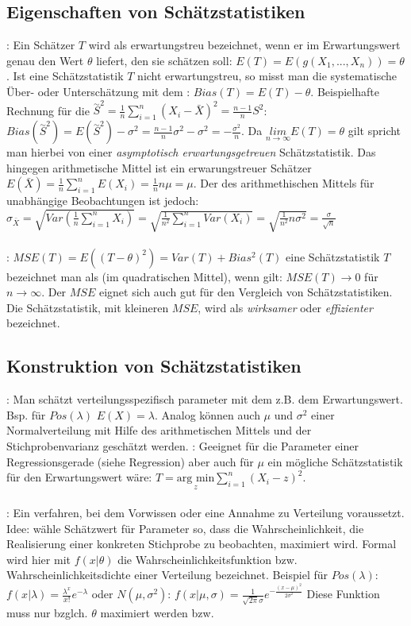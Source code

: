 \subsection{Eigenschaften von Schätzstatistiken}
: Ein Schätzer $T$ wird als erwartungstreu bezeichnet, 
wenn er im Erwartungswert genau den Wert $\theta$ liefert, den sie schätzen soll: $E(T) = E(g(X_1, ..., X_n)) = \theta$. Ist eine Schätzstatistik $T$ nicht erwartungstreu, 
so misst man die systematische Über- oder Unterschätzung mit dem : 
$Bias(T) = E(T) - \theta$. Beispielhafte Rechnung für die  
$\overset{\sim}{S}^2 = \frac{1}{n} \sum_{i=1}^{n}(X_i - \bar{X})^2 = \frac{n - 1}{n}S^2$: 
$Bias(\overset{\sim}{S}^2) = E(\overset{\sim}{S}^2) - \sigma^2 = \frac{n - 1}{n}\sigma^2 - \sigma^2 = - \frac{\sigma^2}{n}$. 
Da $\underset{n \rightarrow \infty}{lim} E(T) = \theta$ gilt spricht man hierbei von einer \emph{asymptotisch erwartungsgetreuen} Schätzstatistik. 
Das hingegen arithmetische Mittel ist ein erwarungstreuer Schätzer 
$E(\bar{X}) = \frac{1}{n}\sum_{i=1}^{n}E(X_i)=\frac{1}{n}n\mu = \mu$. 
Der  des arithmethischen Mittels für unabhängige Beobachtungen ist jedoch: 
$\sigma_{\bar{X}} = \sqrt{Var(\frac{1}{n} \sum_{i=1}^{n}X_i)} = \sqrt{\frac{1}{n^2}\sum_{i=1}^nVar(X_i)} = \sqrt{\frac{1}{n^2}n\sigma^2} = \frac{\sigma}{\sqrt{n}}$\\\\
: $MSE(T) = E((T - \theta)^2) = Var(T) + Bias^2(T)$ eine Schätzstatistik $T$
bezeichnet man als  (im quadratischen Mittel), wenn gilt: $MSE(T) \rightarrow 0$ für $n \rightarrow \infty$.
Der $MSE$ eignet sich auch gut für den Vergleich von Schätzstatistiken. Die Schätzstatistik, mit kleineren $MSE$,
wird als \emph{wirksamer} oder \emph{effizienter} bezeichnet. 
\subsection{Konstruktion von Schätzstatistiken}
: Man schätzt verteilungsspezifisch parameter mit dem z.B. dem Erwartungswert. Bsp. für $Pos(\lambda)$
$E(X) = \lambda$. Analog können auch $\mu$ und $\sigma^2$ einer Normalverteilung mit Hilfe des arithmetischen Mittels und der Stichprobenvarianz geschätzt werden.
: Geeignet für die Parameter einer Regressionsgerade (siehe Regression) aber auch für $\mu$ ein mögliche Schätzstatistik
für den Erwartungswert wäre: $T = \underset{z}{\text{arg min}}\sum_{i=1}^{n}(X_i - z)^2$.\\\\
: Ein verfahren, bei dem Vorwissen oder eine Annahme zu Verteilung voraussetzt. 
Idee: wähle Schätzwert für Parameter so, dass die Wahrscheinlichkeit, die Realisierung einer konkreten Stichprobe zu beobachten, maximiert wird.
Formal wird hier mit $f(x|\theta)$ die Wahrscheinlichkeitsfunktion bzw. Wahrscheinlichkeitsdichte einer Verteilung bezeichnet. 
Beispiel für $Pos(\lambda)$: $f(x|\lambda) = \frac{\lambda^x}{x!}e^{-\lambda}$ oder $N(\mu, \sigma^2)$: $f(x|\mu, \sigma) = \frac{1}{\sqrt{2\pi}\sigma}e^{-\frac{(x-\mu)^2}{2\sigma^2}}$
Diese Funktion muss nur bzglch. $\theta$ maximiert werden bzw. 
